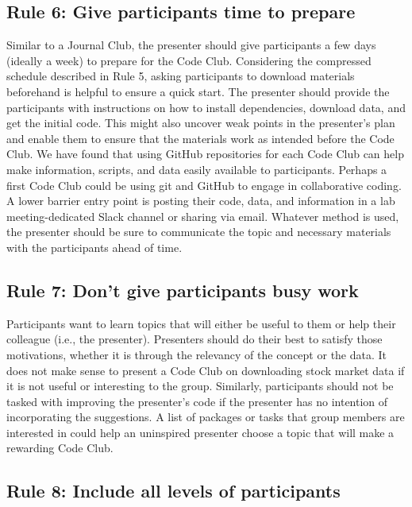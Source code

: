 \documentclass[11pt,]{article}
\begin{document}
\subsection{Rule 6: Give participants time to
prepare}\label{rule-6-give-participants-time-to-prepare}

Similar to a Journal Club, the presenter should give participants a few
days (ideally a week) to prepare for the Code Club. Considering the
compressed schedule described in Rule 5, asking participants to download
materials beforehand is helpful to ensure a quick start. The presenter
should provide the participants with instructions on how to install
dependencies, download data, and get the initial code. This might also
uncover weak points in the presenter's plan and enable them to ensure
that the materials work as intended before the Code Club. We have found
that using GitHub repositories for each Code Club can help make
information, scripts, and data easily available to participants. Perhaps
a first Code Club could be using git and GitHub to engage in
collaborative coding. A lower barrier entry point is posting their code,
data, and information in a lab meeting-dedicated Slack channel or
sharing via email. Whatever method is used, the presenter should be sure
to communicate the topic and necessary materials with the participants
ahead of time.

\subsection{Rule 7: Don't give participants busy
work}\label{rule-7-dont-give-participants-busy-work}

Participants want to learn topics that will either be useful to them or
help their colleague (i.e., the presenter). Presenters should do their
best to satisfy those motivations, whether it is through the relevancy
of the concept or the data. It does not make sense to present a Code
Club on downloading stock market data if it is not useful or interesting
to the group. Similarly, participants should not be tasked with
improving the presenter's code if the presenter has no intention of
incorporating the suggestions. A list of packages or tasks that group
members are interested in could help an uninspired presenter choose a
topic that will make a rewarding Code Club.

\subsection{Rule 8: Include all levels of
participants}\label{rule-8-include-all-levels-of-participants}
\end{document}
